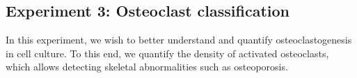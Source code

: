\documentclass{article}
\begin{document}
\subsection{Experiment 3: Osteoclast classification}

In this experiment, we wish to better understand and quantify osteoclastogenesis in cell culture.
To this end, we quantify the density of activated osteoclasts, which allows detecting skeletal abnormalities such as osteoporosis.

\begin{figure}[h!]
  \begin{center}
    \\
     \ 
     \ 

\end{center}
\end{figure}
\end{document}

